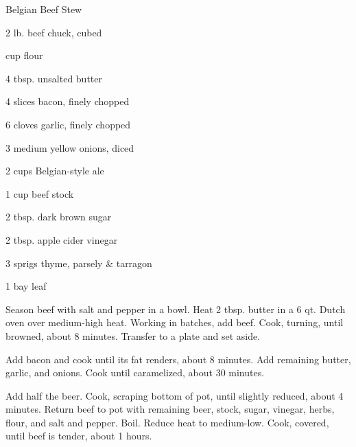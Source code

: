 \documentclass{cookbook}
\begin{document}
\begin{recipe}{Belgian Beef Stew}

\begin{ingredients}
    \item 2 lb. beef chuck, cubed
    \item {} cup flour
    \item 4 tbsp. unsalted butter
    \item 4 slices bacon, finely chopped
    \item 6 cloves garlic, finely chopped
    \item 3 medium yellow onions, diced
    \item 2 cups Belgian-style ale
    \item 1 cup beef stock
    \item 2 tbsp. dark brown sugar
    \item 2 tbsp. apple cider vinegar
    \item 3 sprigs thyme, parsely \& tarragon
    \item 1 bay leaf
\end{ingredients}

Season beef with salt and pepper in a bowl. Heat 2 tbsp. butter in a 6 qt. Dutch oven over medium-high heat. Working in batches, add beef. Cook, turning, until browned, about 8 minutes. Transfer to a plate and set aside.

Add bacon and cook until its fat renders, about 8 minutes. Add remaining butter, garlic, and onions. Cook until caramelized, about 30 minutes.

Add half the beer. Cook, scraping bottom of pot, until slightly reduced, about 4 minutes. Return beef to pot with remaining beer, stock, sugar, vinegar, herbs, flour, and salt and pepper. Boil. Reduce heat to medium-low. Cook, covered, until beef is tender, about 1  hours.

\end{recipe}
\end{document}
